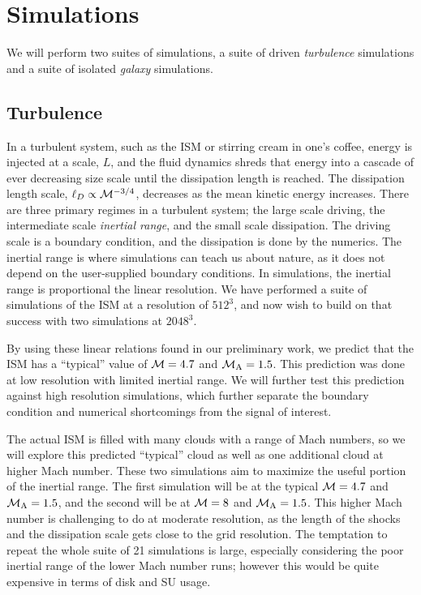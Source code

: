 \section{Simulations}

We will perform two suites of simulations, a suite of driven \emph{turbulence}
simulations and a suite of isolated \emph{galaxy} simulations.

\subsection{Turbulence}

\def\vrms{\ensuremath{V_{r.m.s}}}

In a turbulent system, such as the ISM or stirring cream in one's coffee,
energy is injected at a scale, $L$, and the fluid dynamics shreds that energy
into a cascade of ever decreasing size scale until the dissipation length is
reached.  The dissipation length scale, $\ell_D\propto \mathcal{M}^{-3/4}$,
decreases as the mean kinetic energy increases.  There are three primary regimes
in a turbulent system; the large scale driving, the intermediate scale \emph{
inertial range},
and the small scale dissipation.  The driving scale is a boundary condition, and
the dissipation is done by the numerics.  
The inertial range is where simulations can teach us about nature, as it does
not depend on the user-supplied boundary conditions.  In simulations, the inertial range is
proportional the linear resolution.    We have performed a suite of simulations
of the ISM at a resolution of $512^3$, and now wish to build on that success
with two simulations at $2048^3$.

By using these linear relations found in our preliminary work,
 we predict that the ISM has a ``typical'' value of
$\mathcal{M}=4.7$ and $\mathcal{M_{\rm{A}}}=1.5$.  This prediction was done at low resolution with
limited inertial range.  
We will further test this prediction against high resolution simulations, which
further separate the boundary condition and numerical shortcomings from the
signal of interest.

The actual ISM is filled with many
clouds with a range of Mach numbers, so we will explore this predicted
``typical'' cloud as well as one additional cloud at higher Mach number.  
These two simulations aim to maximize the useful portion of the
inertial range.  The first simulation will be at the typical $\mathcal{M}=4.7$ and
$\mathcal{M_{\rm{A}}}=1.5$, and the second will be at $\mathcal{M}=8$ and $\mathcal{M_{\rm{A}}}=1.5$.  This
higher Mach number is challenging to do at moderate resolution, as the length of
the shocks and the dissipation scale gets close to the grid resolution.  
The temptation to repeat the whole suite of 21 simulations is large, especially
considering the poor inertial range of the lower Mach number runs; however this
would be quite expensive in terms of disk and SU usage.

